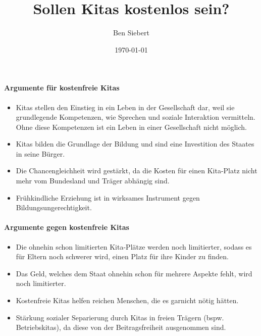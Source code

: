 \documentclass[a4paper]{report}
\begin{document}
	\bsremovechaptertitle
	\bsremoveparttitle
	
	\title{Sollen Kitas kostenlos sein?}
	\author{Ben Siebert}
	\date{\today}
	\maketitle
	
	\paragraph{Argumente für kostenfreie Kitas} \mbox{}
	\begin{itemize}
		\item Kitas stellen den Einstieg in ein Leben in der Gesellschaft dar, weil sie grundlegende Kompetenzen, wie Sprechen und soziale Interaktion vermitteln. Ohne diese Kompetenzen ist ein Leben in einer Gesellschaft nicht möglich.
		\item Kitas bilden die Grundlage der Bildung und sind eine Investition des Staates in seine Bürger.
		\item Die Chancengleichheit wird gestärkt, da die Kosten für einen Kita-Platz nicht mehr vom Bundesland und Träger abhängig sind.
		\item Frühkindliche Erziehung ist in wirksames Instrument gegen Bildungsungerechtigkeit.
	\end{itemize}

	\paragraph{Argumente gegen kostenfreie Kitas} \mbox{}
	\begin{itemize}
		\item Die ohnehin schon limitierten Kita-Plätze werden noch limitierter, sodass es für Eltern noch schwerer wird, einen Platz für ihre Kinder zu finden.
		\item Das Geld, welches dem Staat ohnehin schon für mehrere Aspekte fehlt, wird noch limitierter.
		\item Kostenfreie Kitas helfen reichen Menschen, die es garnicht nötig hätten.
		\item Stärkung sozialer Separierung durch Kitas in freien Trägern (bspw. Betriebskitas), da diese von der Beitragsfreiheit ausgenommen sind.
	\end{itemize}
\end{document}
